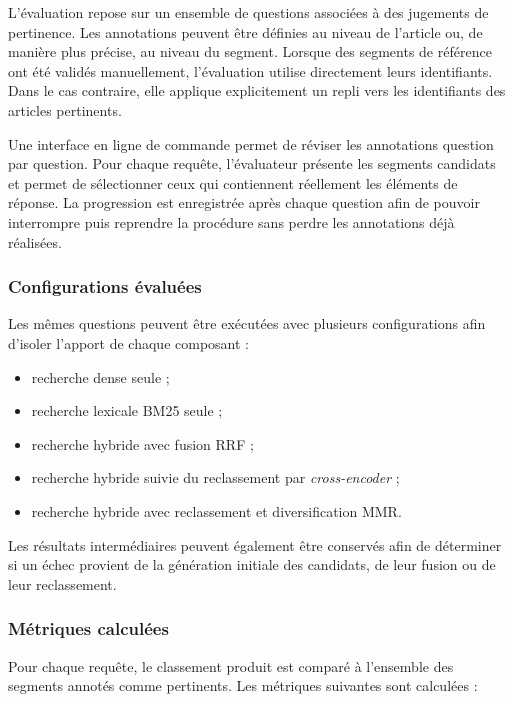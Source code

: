 L'évaluation repose sur un ensemble de questions associées à des jugements de
pertinence. Les annotations peuvent être définies au niveau de l'article ou, de
manière plus précise, au niveau du segment. Lorsque des segments de référence ont été
validés manuellement, l'évaluation utilise directement leurs identifiants. Dans le
cas contraire, elle applique explicitement un repli vers les identifiants des
articles pertinents.

Une interface en ligne de commande permet de réviser les annotations question par
question. Pour chaque requête, l'évaluateur présente les segments candidats et permet
de sélectionner ceux qui contiennent réellement les éléments de réponse. La
progression est enregistrée après chaque question afin de pouvoir interrompre puis
reprendre la procédure sans perdre les annotations déjà réalisées.

\subsubsection{Configurations évaluées}

Les mêmes questions peuvent être exécutées avec plusieurs configurations afin
d'isoler l'apport de chaque composant :

\begin{itemize}
  \item recherche dense seule ;
  \item recherche lexicale BM25 seule ;
  \item recherche hybride avec fusion RRF ;
  \item recherche hybride suivie du reclassement par \emph{cross-encoder} ;
  \item recherche hybride avec reclassement et diversification MMR.
\end{itemize}

Les résultats intermédiaires peuvent également être conservés afin de déterminer si
un échec provient de la génération initiale des candidats, de leur fusion ou de leur
reclassement.

\subsubsection{Métriques calculées}

Pour chaque requête, le classement produit est comparé à l'ensemble des segments
annotés comme pertinents. Les métriques suivantes sont calculées :

